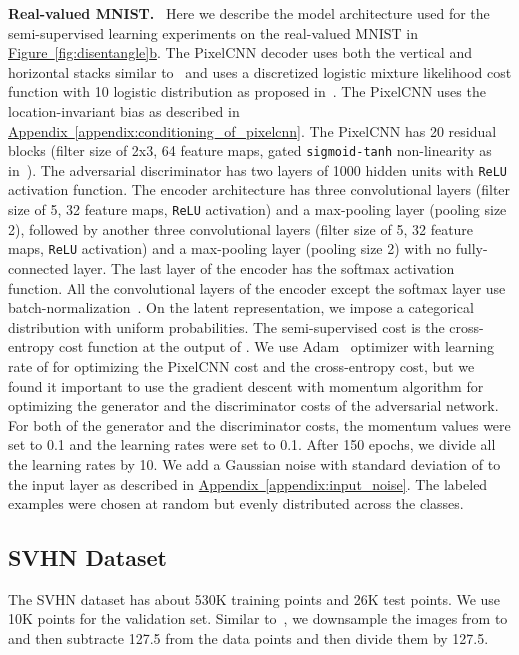 \documentclass{article}
\newcommand{\myfigg}[2]{\hyperref[fig:#1]{Figure~\ref*{fig:#1}#2}}
\newcommand{\myappendix}[1]{\hyperref[appendix:#1]{Appendix~\ref*{appendix:#1}}}
\DeclareRobustCommand{\parhead}[1]{\textbf{#1}~}
\begin{document}
\begin{appendices}
\parhead{Real-valued MNIST.} 
Here we describe the model architecture used for the semi-supervised learning experiments on the real-valued MNIST in \myfigg{disentangle}{b}.
The PixelCNN decoder uses both the vertical and horizontal stacks similar to~\citep{pixelcnn} and uses a discretized logistic mixture likelihood cost function with 10 logistic distribution as proposed in~\citep{pixelcnn++}.
The PixelCNN uses the location-invariant bias as described in \myappendix{conditioning_of_pixelcnn}.
The PixelCNN has 20 residual blocks (filter size of 2x3, 64 feature maps, gated \texttt{sigmoid-tanh} non-linearity as in~\citep{pixelcnn}). 
The adversarial discriminator has two layers of 1000 hidden units with \texttt{ReLU} activation function. 
The encoder architecture has three convolutional layers (filter size of 5, 32 feature maps, \texttt{ReLU} activation) and a max-pooling layer (pooling size 2), followed by another three convolutional layers (filter size of 5, 32 feature maps, \texttt{ReLU} activation) and a max-pooling layer (pooling size 2) with no fully-connected layer.
The last layer of the encoder  has the softmax activation function. All the convolutional layers of the encoder except the softmax layer use batch-normalization~\citep{batch}. 
On the latent representation, we impose a categorical distribution with uniform probabilities. 
The semi-supervised cost is the cross-entropy cost function at the output of . We use Adam~\citep{Adam} optimizer with learning rate of  for optimizing the PixelCNN cost and the cross-entropy cost, but we found it important to use the gradient descent with momentum algorithm for optimizing the generator and the discriminator costs of the adversarial network. 
For both of the generator and the discriminator costs, the momentum values were set to 0.1 and the learning rates were set to 0.1. After 150 epochs, we divide all the learning rates by 10.
We add a Gaussian noise with standard deviation of  to the input layer as described in \myappendix{input_noise}. 
The labeled examples were chosen at random but evenly distributed across the classes.







\subsection{SVHN Dataset}\label{appendix:svhn}
The SVHN dataset has about 530K training points and 26K test points. We use 10K points for the validation set.
Similar to~\citep{vat}, we downsample the images from  to  and then subtracte 127.5 from the data points and then divide them by 127.5. 


\end{appendices}
\end{document}

